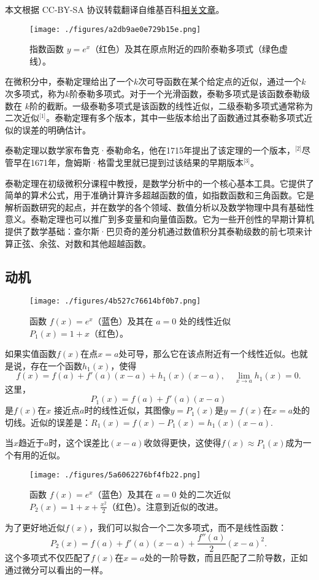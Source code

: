 
本文根据 CC-BY-SA 协议转载翻译自维基百科\href{https://en.wikipedia.org/wiki/Taylor\%27s_theorem}{相关文章}。

\begin{figure}[ht]
\centering
\texttt{[image: ./figures/a2db9ae0e729b15e.png]}
\caption{指数函数 \( y = e^x \)（红色）及其在原点附近的四阶泰勒多项式（绿色虚线）。} \label{fig_TLGS_1}
\end{figure}
在微积分中，泰勒定理给出了一个\( k \)次可导函数在某个给定点的近似，通过一个\( k \)次多项式，称为\( k \)阶泰勒多项式。对于一个光滑函数，泰勒多项式是该函数泰勒级数在 \( k \)阶的截断。一级泰勒多项式是该函数的线性近似，二级泰勒多项式通常称为二次近似\(^\text{[1]}\)。泰勒定理有多个版本，其中一些版本给出了函数通过其泰勒多项式近似的误差的明确估计。

泰勒定理以数学家布鲁克·泰勒命名，他在1715年提出了该定理的一个版本，\(^\text{[2]}\)尽管早在1671年，詹姆斯·格雷戈里就已提到过该结果的早期版本\(^\text{[3]}\)。

泰勒定理在初级微积分课程中教授，是数学分析中的一个核心基本工具。它提供了简单的算术公式，用于准确计算许多超越函数的值，如指数函数和三角函数。它是解析函数研究的起点，并在数学的各个领域、数值分析以及数学物理中具有基础性意义。泰勒定理也可以推广到多变量和向量值函数。它为一些开创性的早期计算机提供了数学基础：查尔斯·巴贝奇的差分机通过数值积分其泰勒级数的前七项来计算正弦、余弦、对数和其他超越函数。
\subsection{动机}
\begin{figure}[ht]
\centering
\texttt{[image: ./figures/4b527c76614bf0b7.png]}
\caption{函数 \( f(x) = e^x \)（蓝色）及其在 \( a = 0 \) 处的线性近似 \( P_1(x) = 1 + x \)（红色）。} \label{fig_TLGS_2}
\end{figure}
如果实值函数\( f(x) \)在点\( x = a \)处可导，那么它在该点附近有一个线性近似。也就是说，存在一个函数\( h_1(x) \)，使得
\[
f(x) = f(a) + f'(a)(x - a) + h_1(x)(x - a), \quad \lim_{x \to a} h_1(x) = 0.~
\]
这里，
\[
P_1(x) = f(a) + f'(a)(x - a)~
\]
是\( f(x) \)在\( x \) 接近点\( a \)时的线性近似，其图像\( y = P_1(x) \)是\( y = f(x) \)在\( x = a \)处的切线。近似的误差是：\(R_1(x) = f(x) - P_1(x) = h_1(x)(x - a)\).

当\( x \)趋近于\( a \)时，这个误差比\( (x - a) \)收敛得更快，这使得\( f(x) \approx P_1(x) \)成为一个有用的近似。
\begin{figure}[ht]
\centering
\texttt{[image: ./figures/5a6062276bf4fb22.png]}
\caption{函数 \( f(x) = e^x \)（蓝色）及其在 \( a = 0 \) 处的二次近似 \( P_2(x) = 1 + x + \frac{x^2}{2} \)（红色）。注意到近似的改进。} \label{fig_TLGS_3}
\end{figure}
为了更好地近似\( f(x) \)，我们可以拟合一个二次多项式，而不是线性函数：
\[
P_2(x) = f(a) + f'(a)(x - a) + \frac{f''(a)}{2}(x - a)^2.~
\]
这个多项式不仅匹配了\( f(x) \)在\( x = a \)处的一阶导数，而且匹配了二阶导数，正如通过微分可以看出的一样。

